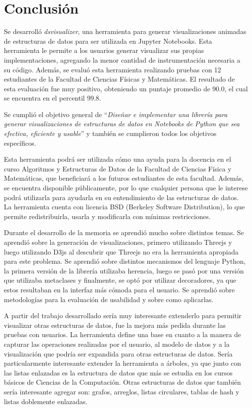 \chapter{Conclusión}


Se desarrolló \textit{dsvisualizer}, una herramienta para generar visualizaciones animadas de estructuras de datos para ser utilizada en Jupyter Notebooks. Esta herramienta le permite a los usuarios generar visualizar sus propias implementaciones, agregando la menor cantidad de instrumentación necesaria a su código. Además, se evaluó esta herramienta realizando pruebas con 12 estudiantes de la Facultad de Ciencias Físicas y Matemáticas. El resultado de esta evaluación fue muy positivo, obteniendo un puntaje promedio de 90.0, el cual se encuentra en el percentil 99.8.

Se cumplió el objetivo general de ``\textit{Diseñar e implementar una librería para generar visualizaciones de estructuras de datos en Notebooks de Python que sea efectiva, eficiente y usable}'' y también se cumplieron todos los objetivos específicos.

Esta herramienta podrá ser utilizada cómo una ayuda para la docencia en el curso Algoritmos y Estructuras de Datos de la Facultad de Ciencias Física y Matemáticas, que beneficiará a los futuros estudiantes de esta facultad. Además, se encuentra disponible públicamente, por lo que cualquier persona que le interese podrá utilizarla para ayudarla en su entendimiento de las estructuras de datos. La herramienta cuenta con licencia BSD (Berkeley Software Distribution), lo que permite redistribuirla, usarla y modificarla con mínimas restricciones.

Durante el desarrollo de la memoria se aprendió mucho sobre distintos temas. Se aprendió sobre la generación de visualizaciones, primero utilizando Threejs y luego utilizando D3js al descubrir que Threejs no era la herramienta apropiada para este problema. Se aprendió sobre distintos mecanismos del lenguaje Python, la primera versión de la librería utilizaba herencia, luego se pasó por una versión que utilizaba metaclases y finalmente, se optó por utilizar decoradores, ya que estos resultaban en la interfaz más cómoda para el usuario. Se aprendió sobre metodologías para la evaluación de usabilidad y sobre como aplicarlas.

A partir del trabajo desarrollado sería muy interesante extenderlo para permitir visualizar otras estructuras de datos, fue la mejora más pedida durante las pruebas con usuarios. La herramienta define una base en cuanto a la manera de capturar las operaciones realizadas por el usuario, al modelo de datos y a la visualización que podría ser expandida para otras estructuras de datos. Sería particularmente interesante extender la herramienta a árboles, ya que junto con las listas enlazadas es la estructura de datos que más se estudia en los cursos básicos de Ciencias de la Computación. Otras estructuras de datos que también sería interesante agregar son: grafos, arreglos, listas circulares, tablas de hash y listas doblemente enlazadas.

